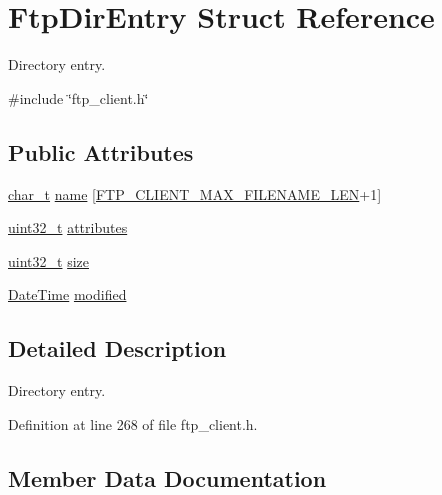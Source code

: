 \hypertarget{structFtpDirEntry}{}\section{Ftp\+Dir\+Entry Struct Reference}
\label{structFtpDirEntry}


Directory entry.  




{\ttfamily \#include \char`\"{}ftp\+\_\+client.\+h\char`\"{}}

\subsection*{Public Attributes}
\begin{DoxyCompactItemize}
\item 
\hyperlink{compiler__port_8h_a40bb5262bf908c328fbcfbe5d29d0201}{char\+\_\+t} \hyperlink{structFtpDirEntry_ac3a25e8ecf4a41cb49e0606e96b5cd44}{name} \mbox{[}\hyperlink{ftp__client_8h_a44901b0f271514699875d70f5da8130f}{F\+T\+P\+\_\+\+C\+L\+I\+E\+N\+T\+\_\+\+M\+A\+X\+\_\+\+F\+I\+L\+E\+N\+A\+M\+E\+\_\+\+L\+EN}+1\mbox{]}
\item 
\hyperlink{stdint_8h_a435d1572bf3f880d55459d9805097f62}{uint32\+\_\+t} \hyperlink{structFtpDirEntry_a25056eeb26b6c0b259286b9f53b2caa7}{attributes}
\item 
\hyperlink{stdint_8h_a435d1572bf3f880d55459d9805097f62}{uint32\+\_\+t} \hyperlink{structFtpDirEntry_ab40397e2e28f76f64b2416a99bb6fada}{size}
\item 
\hyperlink{structDateTime}{Date\+Time} \hyperlink{structFtpDirEntry_a21b61636bb8282399bba62f16bf016d1}{modified}
\end{DoxyCompactItemize}


\subsection{Detailed Description}
Directory entry. 

Definition at line 268 of file ftp\+\_\+client.\+h.



\subsection{Member Data Documentation}
\mbox{\label{structFtpDirEntry_a25056eeb26b6c0b259286b9f53b2caa7}} 
